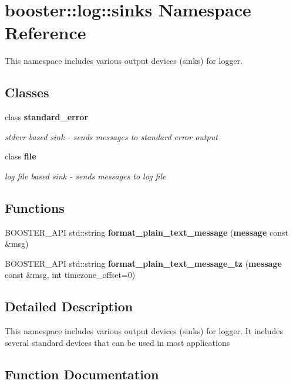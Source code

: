 \section{booster\-:\-:log\-:\-:sinks Namespace Reference}
\label{namespacebooster_1_1log_1_1sinks}


This namespace includes various output devices (sinks) for logger.  


\subsection*{Classes}
\begin{DoxyCompactItemize}
\item 
class {\bf standard\-\_\-error}
\begin{DoxyCompactList}\small\item\em stderr based sink -\/ sends messages to standard error output \end{DoxyCompactList}\item 
class {\bf file}
\begin{DoxyCompactList}\small\item\em log file based sink -\/ sends messages to log file \end{DoxyCompactList}\end{DoxyCompactItemize}
\subsection*{Functions}
\begin{DoxyCompactItemize}
\item 
B\-O\-O\-S\-T\-E\-R\-\_\-\-A\-P\-I std\-::string {\bf format\-\_\-plain\-\_\-text\-\_\-message} ({\bf message} const \&msg)
\item 
B\-O\-O\-S\-T\-E\-R\-\_\-\-A\-P\-I std\-::string {\bf format\-\_\-plain\-\_\-text\-\_\-message\-\_\-tz} ({\bf message} const \&msg, int timezone\-\_\-offset=0)
\end{DoxyCompactItemize}


\subsection{Detailed Description}
This namespace includes various output devices (sinks) for logger. It includes several standard devices that can be used in most applications 

\subsection{Function Documentation}
